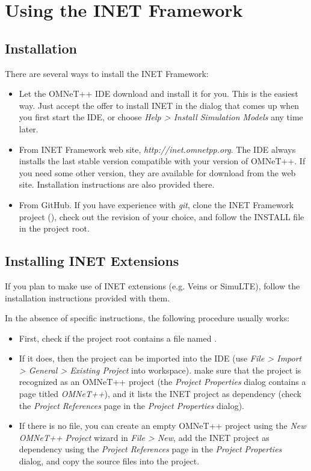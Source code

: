 \chapter{Using the INET Framework}
\label{cha:usage}

\section{Installation}
\label{sec:usage:installation}

There are several ways to install the INET Framework:

\begin{itemize}
  \item Let the OMNeT++ IDE download and install it for you.
      This is the easiest way. Just accept the offer to install INET
      in the dialog that comes up when you first start the IDE, or
      choose \textit{Help > Install Simulation Models} any time later.
  \item From INET Framework web site, \textit{http://inet.omnetpp.org}.
      The IDE always installs the last stable version compatible with
      your version of OMNeT++. If you need some other version, they
      are available for download from the web site. Installation
      instructions are also provided there.
  \item From GitHub. If you have experience with \textit{git},
      clone the INET Framework project (),
      check out the revision of your choice, and follow the INSTALL
      file in the project root.
\end{itemize}


\section{Installing INET Extensions}
\label{sec:usage:installing-inet-extensions}

If you plan to make use of INET extensions (e.g. Veins or SimuLTE),
follow the installation instructions provided with them.

In the absence of specific instructions, the following procedure usually works:

\begin{itemize}
 \item First, check if the project root contains a file named .
 \item If it does, then the project can be imported into the IDE (use \textit{File > Import >
    General > Existing Project} into workspace). make sure that the project is recognized
    as an OMNeT++ project (the \textit{Project Properties} dialog contains a page
    titled \textit{OMNeT++}), and it lists the INET project as dependency
    (check the \textit{Project References} page in the \textit{Project Properties} dialog).
 \item If there is no  file, you can create an empty OMNeT++
    project using the \textit{New OMNeT++ Project} wizard in \textit{File > New},
    add the INET project as dependency using the \textit{Project References} page
    in the \textit{Project Properties} dialog, and copy the source files into the project.
\end{itemize}

